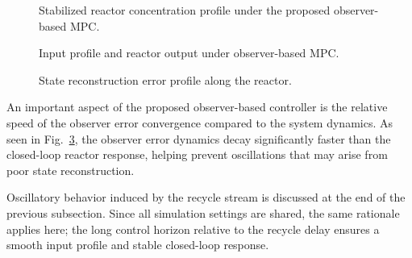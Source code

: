 \begin{figure}[!htbp]
    \centering
    
    \caption{Stabilized reactor concentration profile under the proposed observer-based MPC.}
    \label{fig:2_closed_ECC}
\end{figure}

\begin{figure}[!htbp]
    \centering
    
    \caption{Input profile and reactor output under observer-based MPC.}
    \label{fig:2_input_ECC}
\end{figure}

\begin{figure}[!htbp]
    \centering
    
    \caption{State reconstruction error profile along the reactor.}
    \label{fig:2_error_ECC}
\end{figure}

An important aspect of the proposed observer-based controller is the relative speed of the observer error convergence compared to the system dynamics. As seen in Fig.~\ref{fig:2_error_ECC}, the observer error dynamics decay significantly faster than the closed-loop reactor response, helping prevent oscillations that may arise from poor state reconstruction.

Oscillatory behavior induced by the recycle stream is discussed at the end of the previous subsection. Since all simulation settings are shared, the same rationale applies here; the long control horizon relative to the recycle delay ensures a smooth input profile and stable closed-loop response.
